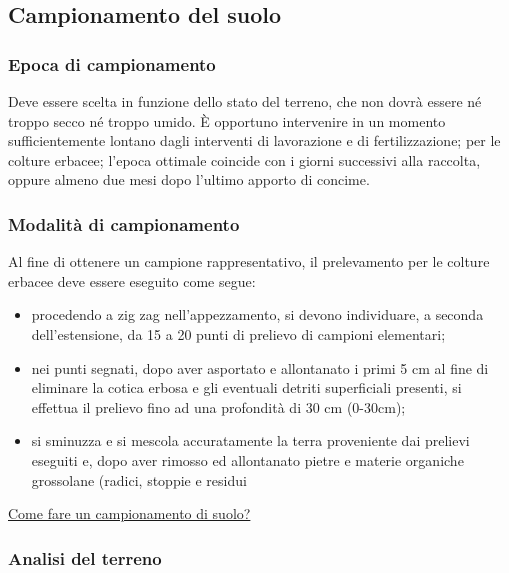\documentclass[
]{book}
\theoremstyle{definition}
\theoremstyle{definition}
\theoremstyle{definition}
\theoremstyle{definition}
\theoremstyle{remark}
\begin{document}
\hypertarget{campionamento-del-suolo}{%
\subsection{Campionamento del suolo}\label{campionamento-del-suolo}}

\hypertarget{epoca-di-campionamento}{%
\subsubsection{Epoca di campionamento}\label{epoca-di-campionamento}}

Deve essere scelta in funzione dello stato del terreno, che non dovrà essere né troppo secco né troppo umido. È opportuno intervenire in un momento sufficientemente lontano dagli interventi di lavorazione e di fertilizzazione; per le colture erbacee; l'epoca ottimale coincide con i giorni successivi alla raccolta, oppure almeno due mesi dopo l'ultimo apporto di concime.

\hypertarget{modalituxe0-di-campionamento}{%
\subsubsection{Modalità di campionamento}\label{modalituxe0-di-campionamento}}

Al fine di ottenere un campione rappresentativo, il prelevamento per le colture erbacee deve essere eseguito come segue:

\begin{itemize}
\item
  procedendo a zig zag nell'appezzamento, si devono individuare, a seconda dell'estensione, da 15 a 20 punti di prelievo di campioni elementari;
\item
  nei punti segnati, dopo aver asportato e allontanato i primi 5 cm al fine di eliminare la cotica erbosa e gli eventuali detriti superficiali presenti, si effettua il prelievo fino ad una profondità di 30 cm (0-30cm);
\item
  si sminuzza e si mescola accuratamente la terra proveniente dai prelievi eseguiti e, dopo aver rimosso ed allontanato pietre e materie organiche grossolane (radici, stoppie e residui
\end{itemize}

\href{https://www.youtube.com/watch?v=3_U9Z3fy0Ig}{Come fare un campionamento di suolo?}

\hypertarget{analisi-del-terreno}{%
\subsubsection{Analisi del terreno}\label{analisi-del-terreno}}
\end{document}
